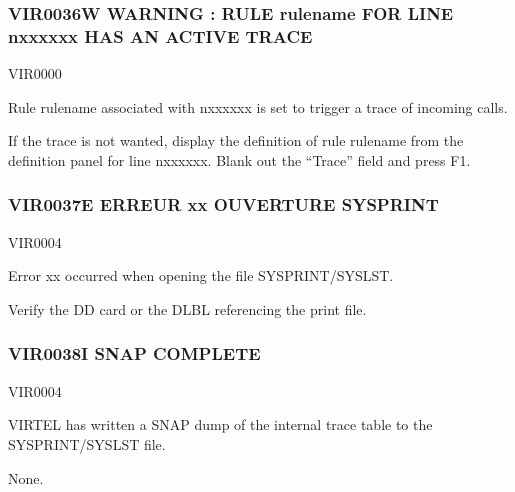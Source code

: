 \documentclass[letterpaper,10pt,english]{sphinxmanual}
\begin{document}
\subsubsection{VIR0036W WARNING : RULE rulename FOR LINE n\sphinxhyphen{}xxxxxx HAS AN ACTIVE TRACE}
\label{\detokenize{messages:vir0036w-warning-rule-rulename-for-line-n-xxxxxx-has-an-active-trace}}\begin{description}
\sphinxAtStartPar
VIR0000

\sphinxAtStartPar
Rule rulename associated with n\sphinxhyphen{}xxxxxx is set to trigger a trace of incoming calls.

\sphinxAtStartPar
If the trace is not wanted, display the definition of rule rulename from the definition panel for line n\sphinxhyphen{}xxxxxx. Blank out the “Trace” field and press F1.

\end{description}


\subsubsection{VIR0037E ERREUR xx OUVERTURE SYSPRINT}
\label{\detokenize{messages:vir0037e-erreur-xx-ouverture-sysprint}}\begin{description}
\sphinxAtStartPar
VIR0004

\sphinxAtStartPar
Error xx occurred when opening the file SYSPRINT/SYSLST.

\sphinxAtStartPar
Verify the DD card or the DLBL referencing the print file.

\end{description}


\subsubsection{VIR0038I SNAP COMPLETE}
\label{\detokenize{messages:vir0038i-snap-complete}}\begin{description}
\sphinxAtStartPar
VIR0004

\sphinxAtStartPar
VIRTEL has written a SNAP dump of the internal trace table to the SYSPRINT/SYSLST file.

\sphinxAtStartPar
None.

\end{description}
\end{document}
